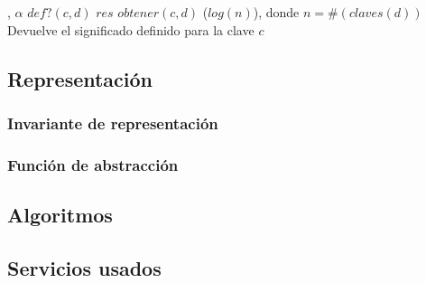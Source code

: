 {   ,
    }
{$\alpha$}
{$def?(c, d)$}
{$res$ \igobs $obtener(c, d)$}
{\bigo($log(n)$), donde $n = \#(claves(d))$}
{}
{Devuelve el significado definido para la clave $c$}



\subsection{Representación}

\subsubsection{Invariante de representación}

\subsubsection{Función de abstracción}

\subsection{Algoritmos}

\subsection{Servicios usados}


